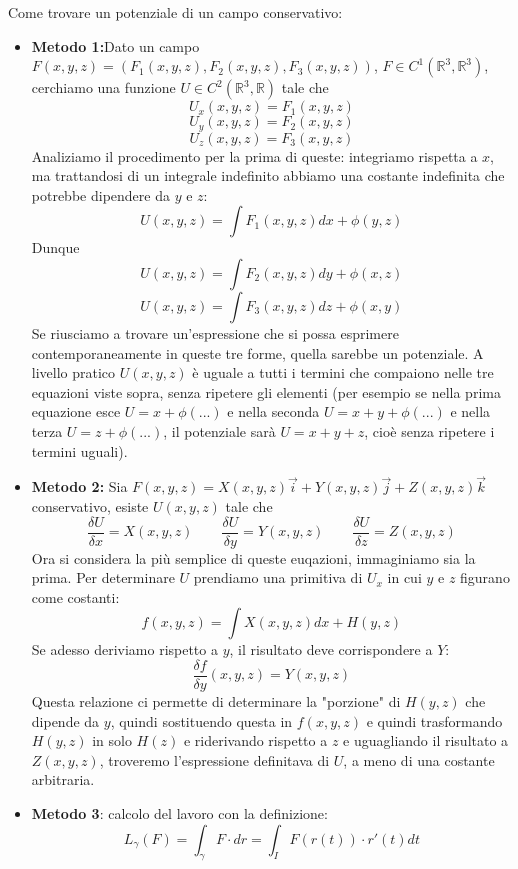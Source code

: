 Come trovare un potenziale di un campo conservativo:
\begin{itemize}
    \item \textbf{Metodo 1:}Dato un campo $F(x,y,z) = (F_1(x,y,z), F_2(x,y,z), F_3(x,y,z))$, $F \in C^1(\mathbb{R}^3, \mathbb{R}^3)$, cerchiamo una funzione $U \in C^2(\mathbb{R}^3, \mathbb{R})$ tale che
    \[
        U_x(x,y,z) = F_1(x,y,z)
    \]
    \[
        U_y(x,y,z) = F_2(x,y,z)
    \]
    \[
        U_z(x,y,z) = F_3(x,y,z)
    \]
    Analiziamo il procedimento per la prima di queste: integriamo rispetta a $x$, ma trattandosi di un integrale indefinito abbiamo una costante indefinita che potrebbe dipendere da $y$ e $z$:
    \[
        U(x,y,z) = \int F_1(x,y,z)dx + \phi(y,z)
    \]
    Dunque
    \[
        U(x,y,z) = \int F_2(x,y,z)dy + \phi(x,z)
    \]
    \[
        U(x,y,z) = \int F_3(x,y,z)dz + \phi(x,y)
    \]
    Se riusciamo a trovare un'espressione che si possa esprimere contemporaneamente in queste tre forme, quella sarebbe un potenziale. A livello pratico $U(x,y,z)$ è uguale a tutti i termini che compaiono nelle tre equazioni viste sopra, senza ripetere gli elementi (per esempio se nella prima equazione esce $U = x + \phi(...)$ e nella seconda $U = x + y + \phi(...)$ e nella terza $U = z + \phi(...)$, il potenziale sarà $U = x +y +z$, cioè senza ripetere i termini uguali).
    \item \textbf{Metodo 2:} Sia $F(x,y,z) = X(x,y,z)\vec{i} + Y(x,y,z)\vec{j} + Z(x,y,z)\vec{k}$ conservativo, esiste $U(x,y,z)$ tale che
    \[
        \frac{\delta U}{\delta x} = X(x,y,z) \quad \quad \frac{\delta U}{\delta y} = Y(x,y,z) \quad \quad \frac{\delta U}{\delta z} = Z(x,y,z)
    \]
    Ora si considera la più semplice di queste euqazioni, immaginiamo sia la prima.\newline
    Per determinare $U$ prendiamo una primitiva di $U_x$ in cui $y$ e $z$ figurano come costanti:
    \[
        f(x,y,z) = \int X(x,y,z)dx + H(y,z)
    \]
    Se adesso deriviamo rispetto a $y$, il risultato deve corrispondere a $Y$:
    \[
        \frac{\delta f}{\delta y}(x,y,z) = Y (x,y,z)
    \]
    Questa relazione ci permette di determinare la "porzione" di $H(y,z)$ che dipende da $y$, quindi sostituendo questa in $f(x,y,z)$ e quindi trasformando $H(y,z)$ in solo $H(z)$ e riderivando rispetto a $z$ e uguagliando il risultato a $Z(x,y,z)$, troveremo l'espressione definitava di $U$, a meno di una costante arbitraria.
    \item \textbf{Metodo 3}: calcolo del lavoro con la definizione:
    \[
        L_\gamma (F) = \int_{\gamma} F \cdot dr = \int_{I} F(r(t))\cdot r'(t) dt
\]
\end{itemize}
